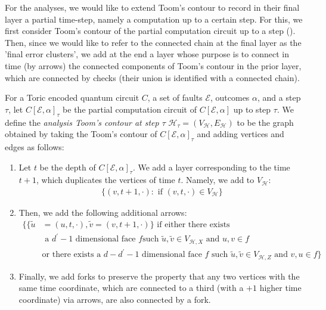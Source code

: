 For the analyses, we would like to extend Toom's contour to record in their final layer a partial time-step, namely a computation up to a certain step. For this, we first consider Toom's contour of the partial computation circuit up to a step (). Then, since we would like to refer to the connected chain at the final layer as the 'final error clusters', we add at the end a layer whose purpose is to connect in time (by arrows) the connected components of Toom's contour in the prior layer, which are connected by checks (their union is identified with a connected chain).

\begin{definition}
  For a Toric encoded quantum circuit $C$, a set of faults $\mathcal{E}$, outcomes $\alpha$, and a step $\tau$, let $C[\mathcal{E},\alpha]_{\tau}$ be the partial computation circuit of $C[\mathcal{E},\alpha]$ up to step $\tau$. We define the \textit{analysis Toom's contour at step $\tau$} $\mathcal{H}_{\tau} = (V_{\mathcal{H}}, E_{\mathcal{H}})$ to be the graph obtained by taking the Toom's contour of $C[\mathcal{E},\alpha]_{\tau}$ and adding vertices and edges as follows:
  \begin{enumerate}
    \item Let $t$ be the depth of $C[\mathcal{E},\alpha]_{\tau}$. We add a layer corresponding to the time $t+1$, which duplicates the vertices of time $t$. Namely, we add to $V_{\mathcal{H}}$:
\begin{equation*}
  \begin{split}
    \big\{ (v,t+1, \cdot ) : \text{ if }  (v,t, \cdot ) \in V_{\mathcal{H}}  \big\}
  \end{split}
\end{equation*}
    \item Then, we add the following additional arrows:
        \begin{equation*}
          \begin{split}
            \bigl\{ \bigl\{ \tilde{u} & = (u,t, \cdot ),  \tilde{v}= (v,t+1,\cdot)  \bigr\}  \text{ if  either there exists }\\ 
           & \text{ a } d^{\prime}-1  \text{ dimensional face } f  \text{such } \tilde{u},\tilde{v} \in V_{\mathcal{H},X} \text{ and } u,v \in f  \\
          & \text{or there exists a } d - d^{\prime}-1  \text{ dimensional face } f \text{ such } \tilde{u},\tilde{v} \in V_{\mathcal{H},Z} \text{ and } v,u \in f   \bigr\}  
          \end{split}
        \end{equation*}
      \item Finally, we add forks to preserve the property that any two vertices with the same time coordinate, which are connected to a third (with a $+1$ higher time coordinate) via arrows, are also connected by a fork.
  \end{enumerate}
\end{definition}




